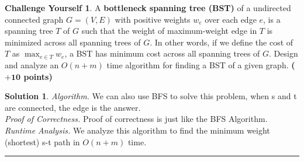 \documentclass{article}
\theoremstyle{definition}
\newtheorem*{challenge}{Challenge Yourself}
\def\fline{\rule{0.75\linewidth}{0.5pt}}
\newcommand{\finishline}{\begin{center}\fline\end{center}}
\newtheorem*{solution*}{Solution}
\newenvironment{solution}{\begin{solution*}}{{\finishline} \end{solution*}}
\newcommand{\grade}[1]{\hfill{\textbf{($\mathbf{#1}$ points)}}}
\begin{document}
\smallskip



\smallskip

\begin{challenge}
	A \textbf{bottleneck spanning tree (BST)} of a undirected connected graph $G=(V,E)$ with positive weights $w_e$ over each edge $e$, is a spanning tree $T$ of $G$ such that the weight of maximum-weight edge in $T$ is minimized 
	across all spanning trees of $G$. In other words, if we define the cost of $T$ as $\max_{e \in T} w_e$, a BST has minimum cost across all spanning trees of $G$. Design and analyze an $O(n+m)$ time algorithm for finding a BST of a given graph. 
	  \grade{+10}
	  
\begin{solution}

	\emph{Algorithm.}  We can also use BFS to solve this problem, when s and t are connected, the edge is the answer. \\
	
	\emph{Proof of Correctness.} Proof of correctness is just like the BFS Algorithm. \\
	
	\emph{Runtime Analysis.} We analyze this algorithm to find the minimum weight (shortest) s-t path in $O(n + m)$ time. \\
 
\end{solution}
	  
\end{challenge}

\smallskip
\end{document}
